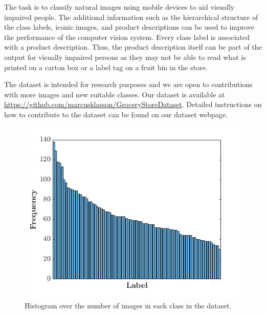 The task is to classify natural images using mobile devices to aid visually impaired people. The additional information such as the hierarchical structure of the class labels, iconic images, and product descriptions can be used to improve the performance of the computer vision system. Every class label is associated with a product description. Thus, the product description itself can be part of the output for visually impaired persons as they may not be able to read what is printed on a carton box or a label tag on a fruit bin in the store.

The dataset is intended for research purposes and we are open to contributions with more images and new suitable classes. Our dataset is available at \url{https://github.com/marcusklasson/GroceryStoreDataset}. Detailed instructions on how to contribute to the dataset can be found on our dataset webpage.



\begin{figure}[t]
\centering
\includegraphics[width=\columnwidth,height=0.20\paperheight]{figures/hist1_latex_bf14.png}
\caption{Histogram over the number of images in each class in the dataset.}
\label{fig:hist}
\end{figure}

